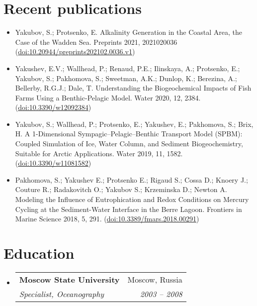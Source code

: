 \documentclass[letterpaper,11pt]{article}
\makeatletter
\newcommand{\resumePubItem}[2]{
  \item\small{
    \textbf{#1}{ #2 \vspace{-2pt}}
  }
}
\newcommand{\resumeSubheading}[4]{
  \vspace{-1pt}\item
    \begin{tabular*}{0.97\textwidth}[t]{l@{\extracolsep{\fill}}r}
      \textbf{#1} & #2 \\
      \textit{\small#3} & \textit{\small #4} \\
    \end{tabular*}\vspace{-5pt}
}
\newcommand{\resumeSubHeadingListStart}{\begin{itemize}[leftmargin=*]}
\newcommand{\resumeSubHeadingListEnd}{\end{itemize}}
\makeatother
\begin{document}
\section{Recent publications}
  \resumeSubHeadingListStart
    \resumePubItem{}
      {Yakubov, S.; Protsenko, E. Alkalinity Generation in the Coastal Area, the Case of the Wadden Sea. Preprints 2021, 2021020036 (\href{https://doi.org/10.20944/preprints202102.0036.v1}{doi:10.20944/preprints202102.0036.v1})}
    \resumePubItem{}
      {Yakushev, E.V.; Wallhead, P.; Renaud, P.E.; Ilinskaya, A.; Protsenko, E.; Yakubov, S.; Pakhomova, S.; Sweetman, A.K.; Dunlop, K.; Berezina, A.; Bellerby, R.G.J.; Dale, T. Understanding the Biogeochemical Impacts of Fish Farms Using a Benthic-Pelagic Model. Water 2020, 12, 2384. (\href{https://doi.org/10.3390/w12092384}{doi:10.3390/w12092384})}
    \resumePubItem{}
      {Yakubov, S.; Wallhead, P.; Protsenko, E.; Yakushev, E.; Pakhomova, S.; Brix, H. A 1-Dimensional Sympagic–Pelagic–Benthic Transport Model (SPBM): Coupled Simulation of Ice, Water Column, and Sediment Biogeochemistry, Suitable for Arctic Applications. Water 2019, 11, 1582. (\href{https://doi.org/10.3390/w11081582}{doi:10.3390/w11081582})}
    \resumePubItem{}
      {Pakhomova, S.; Yakushev E.; Protsenko E.; Rigaud S.; Cossa D.; Knoery J.; Couture R.; Radakovitch O.; Yakubov S.; Krzeminska D.; Newton A.
      Modeling the Influence of Eutrophication and Redox Conditions on Mercury Cycling at the Sediment-Water Interface in the Berre Lagoon. Frontiers in Marine Science 2018, 5, 291.
      (\href{https://doi.org/10.3389/fmars.2018.00291}{doi:10.3389/fmars.2018.00291})}
  \resumeSubHeadingListEnd


\section{Education}
  \resumeSubHeadingListStart
    \resumeSubheading
      {Moscow State University}{Moscow, Russia}
      {Specialist, Oceanography}{2003 -- 2008}
  \resumeSubHeadingListEnd



\end{document}
